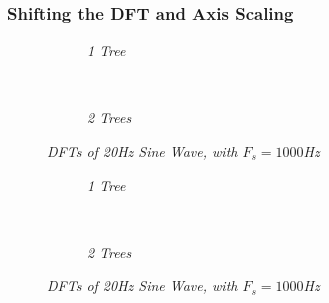 \documentclass[./main.tex]{subfiles}
\begin{document}
\subsubsection{Shifting the DFT and Axis Scaling}

\begin{figure}[h]
	\centering
	\begin{subfigure}[b]{0.49\textwidth}
		\resizebox{\textwidth}{!}{}
		\caption{\textit{1 Tree}}
		\label{fig:1_2_d_ifft_10}
	\end{subfigure}
	~ %
	\begin{subfigure}[b]{0.49\textwidth}
		\resizebox{\textwidth}{!}{}
		\caption{\textit{2 Trees}}
		\label{fig:1_2_d_ifft_128}
	\end{subfigure}
	\label{fig:1_2_d_ifft}
	\caption{\textit{DFTs of 20Hz Sine Wave, with $ F_s = 1000 $Hz}}
\end{figure}


\begin{figure}[h]
	\centering
	\begin{subfigure}[b]{0.49\textwidth}
		\resizebox{\textwidth}{!}{}
		\caption{\textit{1 Tree}}
		\label{fig:1_2_d_dft_odd}
	\end{subfigure}
	~ %
	\begin{subfigure}[b]{0.49\textwidth}
		\resizebox{\textwidth}{!}{}
		\caption{\textit{2 Trees}}
		\label{fig:1_2_d_ifft_odd}
	\end{subfigure}
	\label{fig:1_2_d_ifft}
	\caption{\textit{DFTs of 20Hz Sine Wave, with $ F_s = 1000 $Hz}}
\end{figure}
\end{document}

